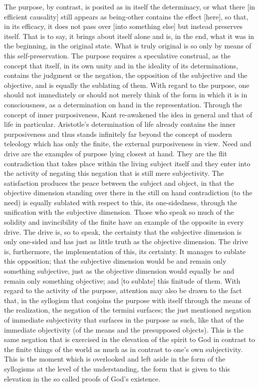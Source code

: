 The purpose, by contrast, is posited as in itself the determinacy,
or what there [in efficient causality] still appears as being-other
contains the effect [here], so that, in its efficacy,
it does not pass over [into something else] but instead preserves itself.
That is to say, it brings about itself alone and is, in the end,
what it was in the beginning, in the original state.
What is truly original is so only by means of this self-preservation.
The purpose requires a speculative construal, as the concept that itself,
in its own unity and in the ideality of its determinations,
contains the judgment or the negation,
the opposition of the subjective and the objective,
and is equally the sublating of them.
With regard to the purpose, one should not immediately or
should not merely think of the form in which it is in consciousness,
as a determination on hand in the representation.
Through the concept of inner purposiveness,
Kant re-awakened the idea in general and that of life in particular.
Aristotle's determination of life already contains the inner purposiveness and
thus stands infinitely far beyond the concept of modern teleology
which has only the finite, the external purposiveness in view.
Need and drive are the examples of purpose lying closest at hand.
They are the flit contradiction that takes place within the living
subject itself and they enter into the activity of negating this
negation that is still mere subjectivity.
The satisfaction produces the peace between the subject and object,
in that the objective dimension standing over there in the still on hand
contradiction (to the need) is equally sublated with respect to this,
its one-sidedness, through the unification with the subjective dimension.
Those who speak so much of the solidity and invincibility of
the finite have an example of the opposite in every drive.
The drive is, so to speak, the certainty that the subjective dimension
is only one-sided and has just as little truth as the objective dimension.
The drive is, furthermore, the implementation of this, its certainty.
It manages to sublate this opposition;
that the subjective dimension would be and remain only something subjective,
just as the objective dimension would equally be and remain only something objective;
and [to sublate] this finitude of them.
With regard to the activity of the purpose, attention may also be drawn to
the fact that, in the syllogism that conjoins the purpose with itself
through the means of the realization, the negation of the termini surfaces;
the just mentioned negation of immediate subjectivity that surfaces in
the purpose as such, like that of the immediate objectivity
(of the means and the presupposed objects).
This is the same negation that is exercised in the elevation of the spirit to God
in contrast to the finite things of the world as much as in contrast to
one's own subjectivity.
This is the moment which is overlooked and left aside in the form of
the syllogisms at the level of the understanding,
the form that is given to this elevation in the so called proofs of God's existence.

